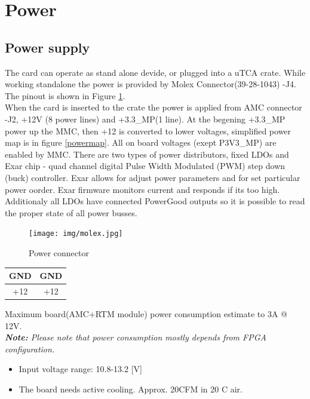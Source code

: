 \section{Power}
\subsection{Power supply}
The card can operate as stand alone devide, or plugged into a uTCA crate. While working standalone the power is provided by Molex Connector(39-28-1043) -J4. The pinout is shown in Figure  \ref{power}.\\
When the card is inserted to the crate the power is applied from AMC connector -J2, +12V (8 power lines) and +3.3\_MP(1 line).
At the begening +3.3\_MP power up the MMC, then +12 is converted to lower voltages, simplified power map is in figure \ref{powermap}. All on board voltages (exept P3V3\_MP) are enabled by MMC. There are two types of power distributors, fixed LDOs and Exar chip - quad channel digital Pulse Width Modulated (PWM) step down (buck) controller. Exar allows for adjust power parameters and for set particular power oorder. Exar firmware monitors current and responds if its too high.  Additionaly all LDOs have connected PowerGood outputs so it is possible to read the proper state of all power busses. 

	\begin{figure}[htbp!]
		\centering
		\texttt{[image: img/molex.jpg]}\\
		\caption{Power connector} \label{power}
	\end{figure}
\begin{center}
\begin{tabular}{|c|c|} \hline
	{\LARGE GND} & {\LARGE GND} \\ \hline
	{\LARGE +12} & {\LARGE +12} \\ \hline
\end{tabular}
\end{center}

Maximum board(AMC+RTM module) power consumption estimate to 3A @ 12V.\\

	\textit{\textbf{Note:} Please note that power consumption mostly depends from FPGA configuration. \\}

\begin{itemize}
 

\item Input voltage range: 10.8-13.2 [V]\\
\item The board needs active cooling. Approx. 20CFM in 20 C air.\\

\end{itemize}

